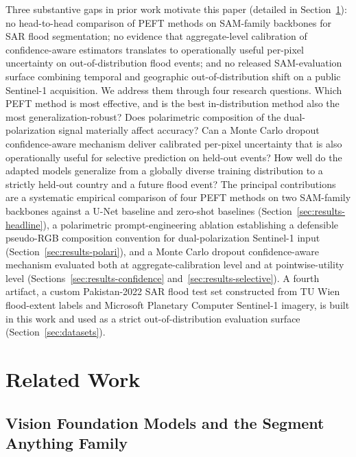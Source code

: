 \documentclass[conference]{IEEEtran}
\begin{document}
Three substantive gaps in prior work motivate this paper (detailed in Section~\ref{sec:related}): no head-to-head comparison of PEFT methods on SAM-family backbones for SAR flood segmentation; no evidence that aggregate-level calibration of confidence-aware estimators translates to operationally useful per-pixel uncertainty on out-of-distribution flood events; and no released SAM-evaluation surface combining temporal and geographic out-of-distribution shift on a public Sentinel-1 acquisition. We address them through four research questions. Which PEFT method is most effective, and is the best in-distribution method also the most generalization-robust? Does polarimetric composition of the dual-polarization signal materially affect accuracy? Can a Monte Carlo dropout confidence-aware mechanism deliver calibrated per-pixel uncertainty that is also operationally useful for selective prediction on held-out events? How well do the adapted models generalize from a globally diverse training distribution to a strictly held-out country and a future flood event? The principal contributions are a systematic empirical comparison of four PEFT methods on two SAM-family backbones against a U-Net baseline and zero-shot baselines (Section~\ref{sec:results-headline}), a polarimetric prompt-engineering ablation establishing a defensible pseudo-RGB composition convention for dual-polarization Sentinel-1 input (Section~\ref{sec:results-polari}), and a Monte Carlo dropout confidence-aware mechanism evaluated both at aggregate-calibration level and at pointwise-utility level (Sections~\ref{sec:results-confidence} and~\ref{sec:results-selective}). A fourth artifact, a custom Pakistan-2022 SAR flood test set constructed from TU Wien flood-extent labels and Microsoft Planetary Computer Sentinel-1 imagery, is built in this work and used as a strict out-of-distribution evaluation surface (Section~\ref{sec:datasets}).

\section{Related Work}
\label{sec:related}

\subsection{Vision Foundation Models and the Segment Anything Family}
\end{document}
